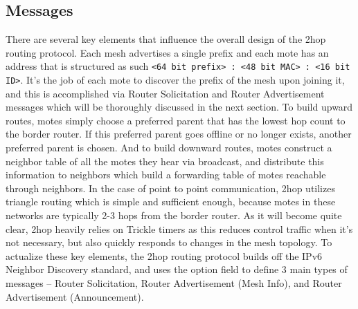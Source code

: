 \subsection{Messages}
There are several key elements that influence the overall design of the 2hop routing protocol.
Each mesh advertises a single prefix and each mote has an address that is structured as such \texttt{<64 bit prefix> : <48 bit MAC> : <16 bit ID>}.
It's the job of each mote to discover the prefix of the mesh upon joining it, and this is accomplished via Router Solicitation and Router Advertisement messages which will be thoroughly discussed in the next section.
To build upward routes, motes simply choose a preferred parent that has the lowest hop count to the border router.
If this preferred parent goes offline or no longer exists, another preferred parent is chosen.
And to build downward routes, motes construct a neighbor table of all the motes they hear via broadcast, and distribute this information to neighbors which build a forwarding table of motes reachable through neighbors.
In the case of point to point communication, 2hop utilizes triangle routing which is simple and sufficient enough, because motes in these networks are typically 2-3 hops from the border router.
As it will become quite clear, 2hop heavily relies on Trickle timers as this reduces control traffic when it's not necessary, but also quickly responds to changes in the mesh topology.
To actualize these key elements, the 2hop routing protocol builds off the IPv6 Neighbor Discovery standard, and uses the option field to define 3 main types of messages -- Router Solicitation, Router Advertisement (Mesh Info), and Router Advertisement (Announcement).

